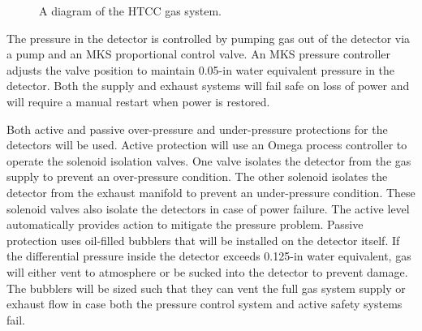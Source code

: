 \begin{figure}
\begin{center}
\vspace{0.5cm}
\caption{\small{A diagram of the HTCC gas system.}}
\label{gas1}
\end{center}
\end{figure}

The pressure in the detector is controlled by pumping gas out of the 
detector via a pump and an MKS proportional control valve.  An MKS pressure 
controller adjusts the valve position to maintain 0.05-in water equivalent
pressure in the detector.  Both the supply and exhaust systems will fail 
safe on loss of power and will require a manual restart when power is 
restored.

Both active and passive over-pressure and under-pressure protections for 
the detectors will be used.  Active protection will use an Omega process 
controller to operate the solenoid isolation valves.  One valve isolates 
the detector from the gas supply to prevent an over-pressure condition. 
The other solenoid isolates the detector from the exhaust manifold to 
prevent an under-pressure condition.  These solenoid valves also isolate 
the detectors in case of power failure.  The active level automatically 
provides action to mitigate the pressure problem.  Passive protection uses 
oil-filled bubblers that will be installed on the detector itself.  If the 
differential pressure inside the detector exceeds 0.125-in water equivalent, 
gas will either vent to atmosphere or be sucked into the detector to prevent 
damage.  The bubblers will be sized such that they can vent the full gas 
system supply or exhaust flow in case both the pressure control system and 
active safety systems fail.
